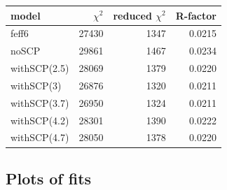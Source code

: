 \documentclass[11pt]{article}
\begin{document}
\begin{center}
  \begin{tabular}{lrrr}
    model & $\chi^2$ & reduced $\chi^2$ & R-factor\\
    \hline
    feff6        & 27430 & 1347 & 0.0215\\
    noSCP        & 29861 & 1467 & 0.0234\\
    withSCP(2.5) & 28069 & 1379 & 0.0220\\
    withSCP(3)   & 26876 & 1320 & 0.0211\\
    withSCP(3.7) & 26950 & 1324 & 0.0211\\
    withSCP(4.2) & 28301 & 1390 & 0.0222\\
    withSCP(4.7) & 28050 & 1378 & 0.0220\\
  \end{tabular}
\end{center}





\subsection{Plots of fits}
\label{sec:orgheadline11}
\end{document}
